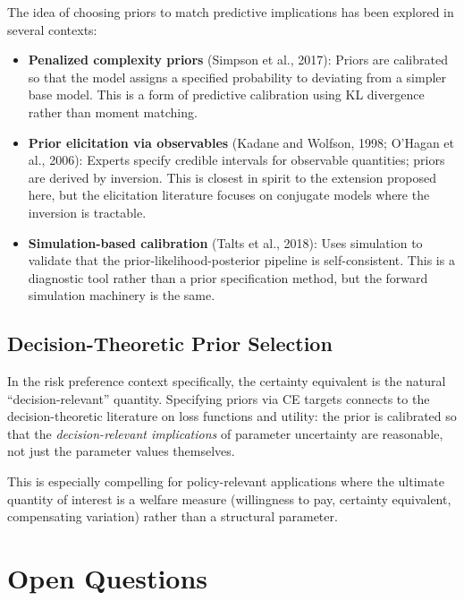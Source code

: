 \documentclass[11pt,a4paper]{article}
\theoremstyle{definition}
\begin{document}
The idea of choosing priors to match predictive implications has been explored
in several contexts:
\begin{itemize}
    \item \textbf{Penalized complexity priors} (Simpson et al., 2017):
    Priors are calibrated so that the model assigns a specified probability to
    deviating from a simpler base model. This is a form of predictive
    calibration using KL divergence rather than moment matching.

    \item \textbf{Prior elicitation via observables} (Kadane and Wolfson, 1998;
    O'Hagan et al., 2006): Experts specify credible intervals for observable
    quantities; priors are derived by inversion. This is closest in spirit to
    the extension proposed here, but the elicitation literature focuses on
    conjugate models where the inversion is tractable.

    \item \textbf{Simulation-based calibration} (Talts et al., 2018): Uses
    simulation to validate that the prior-likelihood-posterior pipeline is
    self-consistent. This is a diagnostic tool rather than a prior specification
    method, but the forward simulation machinery is the same.
\end{itemize}

\subsection{Decision-Theoretic Prior Selection}

In the risk preference context specifically, the certainty equivalent is the
natural ``decision-relevant'' quantity. Specifying priors via CE targets
connects to the decision-theoretic literature on loss functions and utility:
the prior is calibrated so that the \emph{decision-relevant implications} of
parameter uncertainty are reasonable, not just the parameter values themselves.

This is especially compelling for policy-relevant applications where the
ultimate quantity of interest is a welfare measure (willingness to pay,
certainty equivalent, compensating variation) rather than a structural
parameter.


\section{Open Questions}
\end{document}
